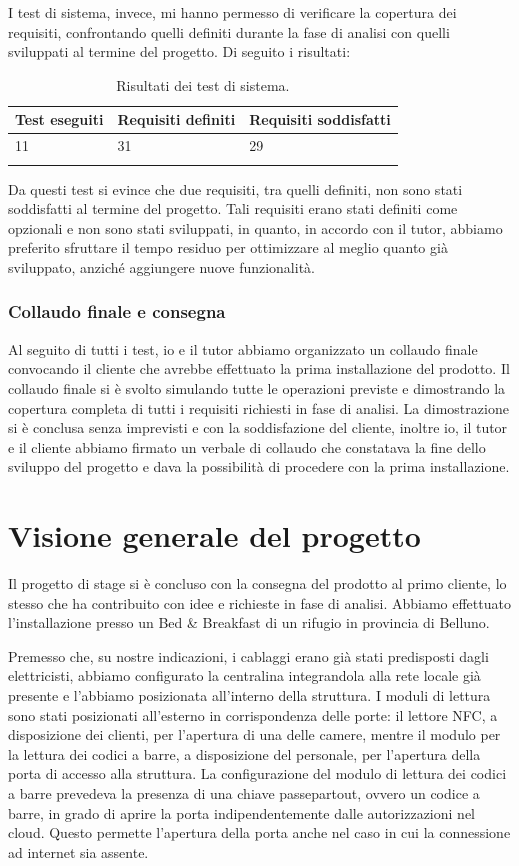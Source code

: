 I test di sistema, invece, mi hanno permesso di verificare la copertura dei requisiti, confrontando quelli definiti durante la fase di analisi con quelli sviluppati al termine del progetto. Di seguito i risultati:

\begin{longtable}{|p{2.7cm}|l|l|}
\hline
\textbf{Test eseguiti} & \textbf{Requisiti definiti} & \textbf{Requisiti soddisfatti} \\ 
\hline
11 & 31 & 29\\ 
\hline
\caption{Risultati dei test di sistema.}
\end{longtable}

Da questi test si evince che due requisiti, tra quelli definiti, non sono stati soddisfatti al termine del progetto. Tali requisiti erano stati definiti come opzionali e non sono stati sviluppati, in quanto, in accordo con il tutor, abbiamo preferito sfruttare il tempo residuo per ottimizzare al meglio quanto già sviluppato, anziché aggiungere nuove funzionalità.

\subsubsection{Collaudo finale e consegna}
Al seguito di tutti i test, io e il tutor abbiamo organizzato un collaudo finale convocando il cliente che avrebbe effettuato la prima installazione del prodotto. Il collaudo finale si è svolto simulando tutte le operazioni previste e dimostrando la copertura completa di tutti i requisiti richiesti in fase di analisi.
La dimostrazione si è conclusa senza imprevisti e con la soddisfazione del cliente, inoltre io, il tutor e il cliente abbiamo firmato un verbale di collaudo che constatava la fine dello sviluppo del progetto e dava la possibilità di procedere con la prima installazione.

\section{Visione generale del progetto}
Il progetto di stage si è concluso con la consegna del prodotto al primo cliente, lo stesso che ha contribuito con idee e richieste in fase di analisi. Abbiamo effettuato l'installazione presso un Bed \& Breakfast di un rifugio in provincia di Belluno. 

Premesso che, su nostre indicazioni, i cablaggi erano già stati predisposti dagli elettricisti, abbiamo configurato la centralina integrandola alla rete locale già presente e l'abbiamo posizionata all'interno della struttura. I moduli di lettura sono stati posizionati all'esterno in corrispondenza delle porte: il lettore NFC, a disposizione dei clienti, per l'apertura di una delle camere, mentre il modulo per la lettura dei codici a barre, a disposizione del personale, per l'apertura della porta di accesso alla struttura. 
La configurazione del modulo di lettura dei codici a barre prevedeva la presenza di una chiave passepartout, ovvero un codice a barre, in grado di aprire la porta indipendentemente dalle autorizzazioni nel cloud. Questo permette l'apertura della porta anche nel caso in cui la connessione ad internet sia assente.

